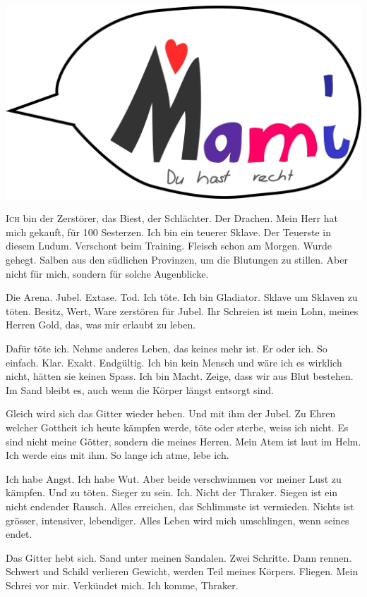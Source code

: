 ﻿\thispagestyle{empty}
\begin{center}
\includegraphics[width=\textwidth]{./bilder/fangen.png}
\end{center}
\vspace*{\fill}
{\centering\fontsize{50}{48} \color{farbe}\par}
\newpage
\lettrine[lines=3, lhang=.2, loversize=.25, lraise=0.05, findent=0.1em,
nindent=0em]{I}{ch} bin der Zerstörer, das Biest, der Schlächter. Der Drachen. Mein Herr hat mich gekauft, für 100 Sesterzen. Ich bin ein teuerer Sklave. Der Teuerste in diesem Ludum. Verschont beim Training. Fleisch schon am Morgen. Wurde gehegt. Salben aus den südlichen Provinzen, um die Blutungen zu stillen. Aber nicht für mich, sondern für solche Augenblicke.

Die Arena. Jubel. Extase. Tod. Ich töte. Ich bin Gladiator. Sklave um Sklaven zu töten. Besitz, Wert, Ware zerstören für Jubel. Ihr Schreien ist mein Lohn, meines Herren Gold, das, was mir erlaubt zu leben.  

Dafür töte ich. Nehme anderes Leben, das keines mehr ist. Er oder ich. So einfach. Klar. Exakt. Endgültig. Ich bin kein Mensch und wäre ich es wirklich nicht, hätten sie keinen Spass. Ich bin Macht. Zeige, dass wir aus Blut bestehen. Im Sand bleibt es, auch wenn die Körper längst entsorgt sind. 

Gleich wird sich das Gitter wieder heben. Und mit ihm der Jubel. Zu Ehren welcher Gottheit ich heute kämpfen werde, töte oder sterbe, weiss ich nicht. Es sind nicht meine Götter, sondern die meines Herren. Mein Atem ist laut im Helm. Ich werde eins mit ihm. So lange ich atme, lebe ich. 

Ich habe Angst. Ich habe Wut. Aber beide verschwimmen vor meiner Lust zu kämpfen. Und zu töten. Sieger zu sein. Ich. Nicht der Thraker. Siegen ist ein nicht endender Rausch. Alles erreichen, das Schlimmste ist vermieden. Nichts ist grösser, intensiver, lebendiger. Alles Leben wird mich umschlingen, wenn seines endet. 

Das Gitter hebt sich. Sand unter meinen Sandalen. Zwei Schritte. Dann rennen. Schwert und Schild verlieren Gewicht, werden Teil meines Körpers. Fliegen. Mein Schrei vor mir. Verkündet mich. Ich komme, Thraker.  \hfill {}
\newpage
 

